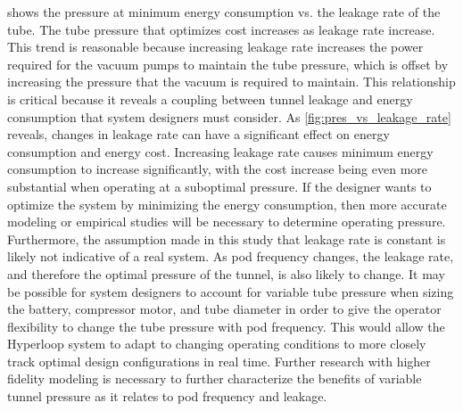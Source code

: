  shows the pressure at minimum energy consumption vs. the leakage rate of the tube. The tube pressure that optimizes cost increases as leakage rate increase. This trend is reasonable because increasing leakage rate increases the power required for the vacuum pumps to maintain the tube pressure, which is offset by increasing the pressure that the vacuum is required to maintain. This relationship is critical because it reveals a coupling between tunnel leakage and energy consumption that system designers must consider. As \cref{fig:pres_vs_leakage_rate} reveals, changes in leakage rate can have a significant effect on energy consumption and energy cost. Increasing leakage rate causes minimum energy consumption to increase significantly, with the cost increase being even more substantial when operating at a suboptimal pressure. If the designer wants to optimize the system by minimizing the energy consumption, then more accurate modeling or empirical studies will be necessary to determine operating pressure. Furthermore, the assumption made in this study that leakage rate is constant is likely not indicative of a real system. As pod frequency changes, the leakage rate, and therefore the optimal pressure of the tunnel, is also likely to change. It may be possible for system designers to account for variable tube pressure when sizing the battery, compressor motor, and tube diameter in order to give the operator flexibility to change the tube pressure with pod frequency. This would allow the Hyperloop system to adapt to changing operating conditions to more closely track optimal design configurations in real time. Further research with higher fidelity modeling is necessary to further characterize the benefits of variable tunnel pressure as it relates to pod frequency and leakage.
